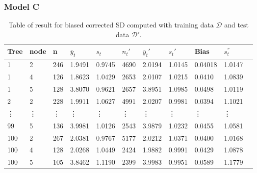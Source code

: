 \subsubsection{Model C}

\vspace{0.1in}
\begin{table}[H]
	\caption{Table of result for biased corrected SD computed with training data $\mathcal{D}$ and test data $\mathcal{D}'$.}
	\begin{tabular}{ |p{0.7cm}|p{0.8cm}|p{0.5cm}|p{1.4cm}|p{1.4cm}|p{1cm}|p{1.4cm}|p{1.5cm}|p{1.5cm}|p{1.5cm}|p{1.4cm}|}
		\hline
		Tree    &node  &n   &$\bar{y}_{t}$ &$s_t$ &$n_t'$ &$\bar{y}_{t}'$ & $s_t'$ &Bias &$s^{''}_t$\\
		\hline
		1&	2&	246&	1.9491&	0.9745&	4690&	2.0194&	1.0145&	0.04018&	1.0147\\

		1&	4&	126&	1.8623&	1.0429&	2653&	2.0107&	1.0215&	0.0410&	1.0839\\

		1&	5&	128&	3.8070&	0.9621&	2657&	3.8951&	1.0985&	0.0498&	1.0119\\

		2&	2&	228&	1.9911&	1.0627&	4991&	2.0207&	0.9981&	0.0394&	1.1021\\
		\vdots & \vdots & \vdots & \vdots & \vdots & \vdots  & \vdots & \vdots&\vdots&\vdots\\  
		
		99&	5&	136&	3.9981&	1.0126&	2543&	3.9879&1.0232&	0.0455&1.0581\\

		100&2&	267&	2.0381&	0.9767&	5177&	2.0212&1.0371&	0.0400&1.0168\\

		100&4&	128&	2.0268&	1.0449&	2424&	1.9882&0.9991&	0.0429&1.0878\\

		100&5&	105&	3.8462&	1.1190&	2399&	3.9983&0.9951&	0.0589&	1.1779\\		
		\hline
	\end{tabular}
	\label{table:4}
\end{table}


